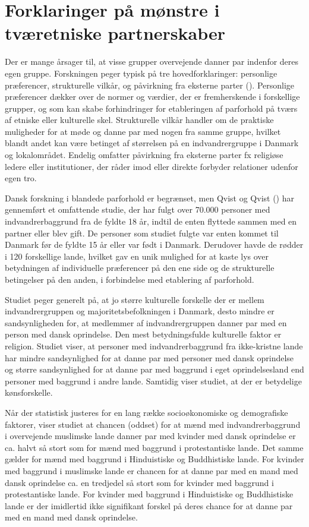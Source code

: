 \documentclass[
]{book}
\begin{document}
\section{Forklaringer på mønstre i tværetniske partnerskaber}\label{forklaringer-puxe5-muxf8nstre-i-tvuxe6retniske-partnerskaber}

Der er mange årsager til, at visse grupper overvejende danner par indenfor deres egen gruppe. Forskningen peger typisk på tre hovedforklaringer: personlige præferencer, strukturelle vilkår, og påvirkning fra eksterne parter (). Personlige præferencer dækker over de normer og værdier, der er fremherskende i forskellige grupper, og som kan skabe forhindringer for etableringen af parforhold på tværs af etniske eller kulturelle skel. Strukturelle vilkår handler om de praktiske muligheder for at møde og danne par med nogen fra samme gruppe, hvilket blandt andet kan være betinget af størrelsen på en indvandrergruppe i Danmark og lokalområdet. Endelig omfatter påvirkning fra eksterne parter fx religiøse ledere eller institutioner, der råder imod eller direkte forbyder relationer udenfor egen tro.

Dansk forskning i blandede parforhold er begrænset, men Qvist og Qvist () har gennemført et omfattende studie, der har fulgt over 70.000 personer med indvandrerbaggrund fra de fyldte 18 år, indtil de enten flyttede sammen med en partner eller blev gift. De personer som studiet fulgte var enten kommet til Danmark før de fyldte 15 år eller var født i Danmark. Derudover havde de rødder i 120 forskellige lande, hvilket gav en unik mulighed for at kaste lys over betydningen af individuelle præferencer på den ene side og de strukturelle betingelser på den anden, i forbindelse med etablering af parforhold.

Studiet peger generelt på, at jo større kulturelle forskelle der er mellem indvandrergruppen og majoritetsbefolkningen i Danmark, desto mindre er sandsynligheden for, at medlemmer af indvandrergruppen danner par med en person med dansk oprindelse. Den mest betydningsfulde kulturelle faktor er religion. Studiet viser, at personer med indvandrerbaggrund fra ikke-kristne lande har mindre sandsynlighed for at danne par med personer med dansk oprindelse og større sandsynlighed for at danne par med baggrund i eget oprindelsesland end personer med baggrund i andre lande. Samtidig viser studiet, at der er betydelige kønsforskelle.

Når der statistisk justeres for en lang række socioøkonomiske og demografiske faktorer, viser studiet at chancen (oddset) for at mænd med indvandrerbaggrund i overvejende muslimske lande danner par med kvinder med dansk oprindelse er ca. halvt så stort som for mænd med baggrund i protestantiske lande. Det samme gælder for mænd med baggrund i Hinduistiske og Buddhistiske lande. For kvinder med baggrund i muslimske lande er chancen for at danne par med en mand med dansk oprindelse ca. en tredjedel så stort som for kvinder med baggrund i protestantiske lande. For kvinder med baggrund i Hinduistiske og Buddhistiske lande er der imidlertid ikke signifikant forskel på deres chance for at danne par med en mand med dansk oprindelse.
\end{document}
